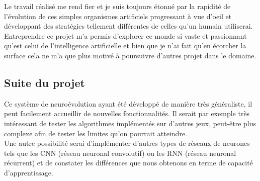 \documentclass{article}
\begin{document}
Le travail réalisé me rend fier et je suis toujours étonné par la rapidité de l'évolution de ces simples organismes artificiels progressant à vue d'oeil et développant des stratégies tellement différentes de celles qu'un humain utiliserai.\\

Entreprendre ce projet m'a permis d'explorer ce monde si vaste et passionnant qu'est celui de l'intelligence artificielle et bien que je n'ai fait qu'en écorcher la surface cela ne m'a que plus motivé à poursuivre d'autres projet dans le domaine.\\

\subsection{Suite du projet}

Ce système de neuroévolution ayant été développé de manière très généraliste, il peut facilement accueillir de nouvelles fonctionnalités. Il serait par exemple très intéressant de tester les algorithmes implémentés sur d'autres jeux, peut-être plus complexe afin de tester les limites qu'on pourrait atteindre.\\

Une autre possibilité serai d'implémenter d'autres types de réseaux de neurones tels que les CNN (réseau neuronal convolutif) ou les RNN (réseau neuronal récurrent) et de constater les différences que nous obtenons en terme de capacité d'apprentissage.

\newpage


\end{document}
